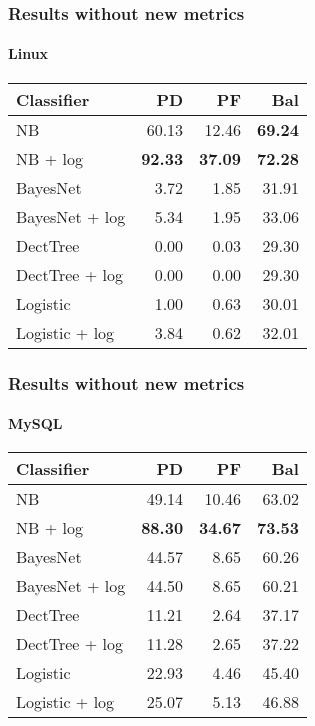 \begin{frame}
 \frametitle{Results without new metrics}
 \framesubtitle{Linux}
 \begin{center}
 \begin{tabular}{lrrr}
  \hspace{0.2cm} Classifier & PD & PF & Bal\\
  \hline
  NB & 60.13 & 12.46 & \textbf{69.24}\\
  NB + log &  \textbf{92.33} & \textbf{37.09} & \textbf{72.28}\\
  BayesNet & 3.72 & 1.85 & 31.91\\
  BayesNet + log & 5.34 & 1.95 & 33.06\\
  DectTree & 0.00 & 0.03 & 29.30\\
  DectTree + log & 0.00 & 0.00 & 29.30\\
  Logistic & 1.00 & 0.63 & 30.01\\
  Logistic + log & 3.84 & 0.62 & 32.01\\
  \hline
 \end{tabular}
 \end{center}
\end{frame}

\begin{frame}
 \frametitle{Results without new metrics}
 \framesubtitle{MySQL}
 \begin{center}
 \begin{tabular}{lrrr}
  \hspace{0.2cm} Classifier & PD & PF & Bal\\
  \hline
  NB & 49.14 & 10.46 & 63.02\\
  NB + log &  \textbf{88.30} & \textbf{34.67} & \textbf{73.53}\\
  BayesNet & 44.57 & 8.65 & 60.26\\
  BayesNet + log & 44.50 & 8.65 & 60.21\\
  DectTree & 11.21 & 2.64 & 37.17\\
  DectTree + log & 11.28 & 2.65 & 37.22\\
  Logistic & 22.93 & 4.46 & 45.40\\
  Logistic + log & 25.07 & 5.13 & 46.88\\
  \hline
 \end{tabular}
 \end{center}
\end{frame}

